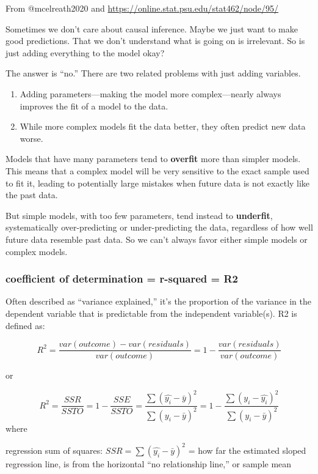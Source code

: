 \documentclass[
]{article}
\begin{document}
From @mcelreath2020 and
\url{https://online.stat.psu.edu/stat462/node/95/}

Sometimes we don't care about causal inference. Maybe we just want to
make good predictions. That we don't understand what is going on is
irrelevant. So is just adding everything to the model okay?

The answer is ``no.'' There are two related problems with just adding
variables.

\begin{enumerate}
\def\labelenumi{\arabic{enumi})}
\item
  Adding parameters---making the model more complex---nearly always
  improves the fit of a model to the data.
\item
  While more complex models fit the data better, they often predict new
  data worse.
\end{enumerate}

Models that have many parameters tend to \textbf{overfit} more than
simpler models. This means that a complex model will be very sensitive
to the exact sample used to fit it, leading to potentially large
mistakes when future data is not exactly like the past data.

But simple models, with too few parameters, tend instead to
\textbf{underfit}, systematically over-predicting or under-predicting
the data, regardless of how well future data resemble past data. So we
can't always favor either simple models or complex models.

\hypertarget{coefficient-of-determination-r-squared-r2}{%
\subsubsection{coefficient of determination = r-squared =
R2}\label{coefficient-of-determination-r-squared-r2}}

Often described as ``variance explained,'' it's the proportion of the
variance in the dependent variable that is predictable from the
independent variable(s). R2 is defined as:

\[R^2 = \frac{var(outcome)-var(residuals)}{var(outcome)}= 1- \frac{var(residuals)}{var(outcome)}\]

or

\[R^2 = \frac{SSR}{SSTO}= 1- \frac{SSE}{SSTO}= \frac{\sum(\hat{y_i}- \bar{y})^2}{\sum(y_i- \bar{y})^2}= 1- \frac{\sum(y_i- \hat{y_i})^2}{\sum(y_i- \bar{y})^2}\]
where

regression sum of squares: \(SSR = \sum(\hat{y_i}- \bar{y})^2\) = how
far the estimated sloped regression line, is from the horizontal ``no
relationship line,'' or sample mean
\end{document}
